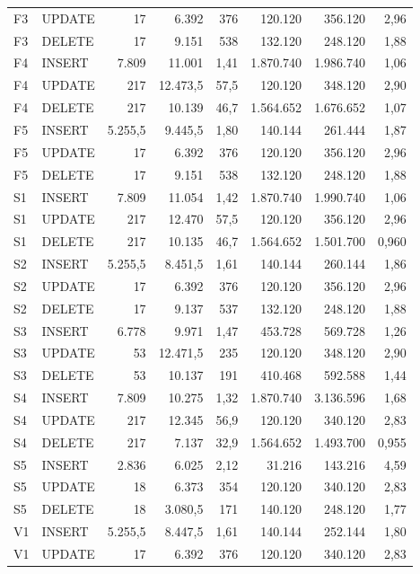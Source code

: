 {\begin{tabular}{llrrrrrr}
F3 & UPDATE & 17 & 6.392 & 376 & 120.120 & 356.120 & 2,96 \\
F3 & DELETE & 17 & 9.151 & 538 & 132.120 & 248.120 & 1,88 \\
F4 & INSERT & 7.809 & 11.001 & 1,41 & 1.870.740 & 1.986.740 & 1,06 \\
F4 & UPDATE & 217 & 12.473,5 & 57,5 & 120.120 & 348.120 & 2,90 \\
F4 & DELETE & 217 & 10.139 & 46,7 & 1.564.652 & 1.676.652 & 1,07 \\
F5 & INSERT & 5.255,5 & 9.445,5 & 1,80 & 140.144 & 261.444 & 1,87 \\
F5 & UPDATE & 17 & 6.392 & 376 & 120.120 & 356.120 & 2,96 \\
F5 & DELETE & 17 & 9.151 & 538 & 132.120 & 248.120 & 1,88 \\
S1 & INSERT & 7.809 & 11.054 & 1,42 & 1.870.740 & 1.990.740 & 1,06 \\
S1 & UPDATE & 217 & 12.470 & 57,5 & 120.120 & 356.120 & 2,96 \\
S1 & DELETE & 217 & 10.135 & 46,7 & 1.564.652 & 1.501.700 & 0,960 \\
S2 & INSERT & 5.255,5 & 8.451,5 & 1,61 & 140.144 & 260.144 & 1,86 \\
S2 & UPDATE & 17 & 6.392 & 376 & 120.120 & 356.120 & 2,96 \\
S2 & DELETE & 17 & 9.137 & 537 & 132.120 & 248.120 & 1,88 \\
S3 & INSERT & 6.778 & 9.971 & 1,47 & 453.728 & 569.728 & 1,26 \\
S3 & UPDATE & 53 & 12.471,5 & 235 & 120.120 & 348.120 & 2,90 \\
S3 & DELETE & 53 & 10.137 & 191 & 410.468 & 592.588 & 1,44 \\
S4 & INSERT & 7.809 & 10.275 & 1,32 & 1.870.740 & 3.136.596 & 1,68 \\
S4 & UPDATE & 217 & 12.345 & 56,9 & 120.120 & 340.120 & 2,83 \\
S4 & DELETE & 217 & 7.137 & 32,9 & 1.564.652 & 1.493.700 & 0,955 \\
S5 & INSERT & 2.836 & 6.025 & 2,12 & 31.216 & 143.216 & 4,59 \\
S5 & UPDATE & 18 & 6.373 & 354 & 120.120 & 340.120 & 2,83 \\
S5 & DELETE & 18 & 3.080,5 & 171 & 140.120 & 248.120 & 1,77 \\
V1 & INSERT & 5.255,5 & 8.447,5 & 1,61 & 140.144 & 252.144 & 1,80 \\
V1 & UPDATE & 17 & 6.392 & 376 & 120.120 & 340.120 & 2,83 \\

\end{tabular}}
